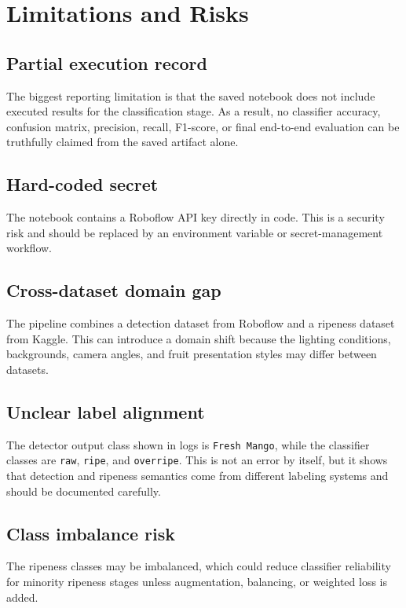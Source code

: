\documentclass[12pt,a4paper]{article}
\begin{document}
\section{Limitations and Risks}
\subsection{Partial execution record}
The biggest reporting limitation is that the saved notebook does not include executed results for the classification stage. As a result, no classifier accuracy, confusion matrix, precision, recall, F1-score, or final end-to-end evaluation can be truthfully claimed from the saved artifact alone.

\subsection{Hard-coded secret}
The notebook contains a Roboflow API key directly in code. This is a security risk and should be replaced by an environment variable or secret-management workflow.

\subsection{Cross-dataset domain gap}
The pipeline combines a detection dataset from Roboflow and a ripeness dataset from Kaggle. This can introduce a domain shift because the lighting conditions, backgrounds, camera angles, and fruit presentation styles may differ between datasets.

\subsection{Unclear label alignment}
The detector output class shown in logs is \texttt{Fresh Mango}, while the classifier classes are \texttt{raw}, \texttt{ripe}, and \texttt{overripe}. This is not an error by itself, but it shows that detection and ripeness semantics come from different labeling systems and should be documented carefully.

\subsection{Class imbalance risk}
The ripeness classes may be imbalanced, which could reduce classifier reliability for minority ripeness stages unless augmentation, balancing, or weighted loss is added.
\end{document}
